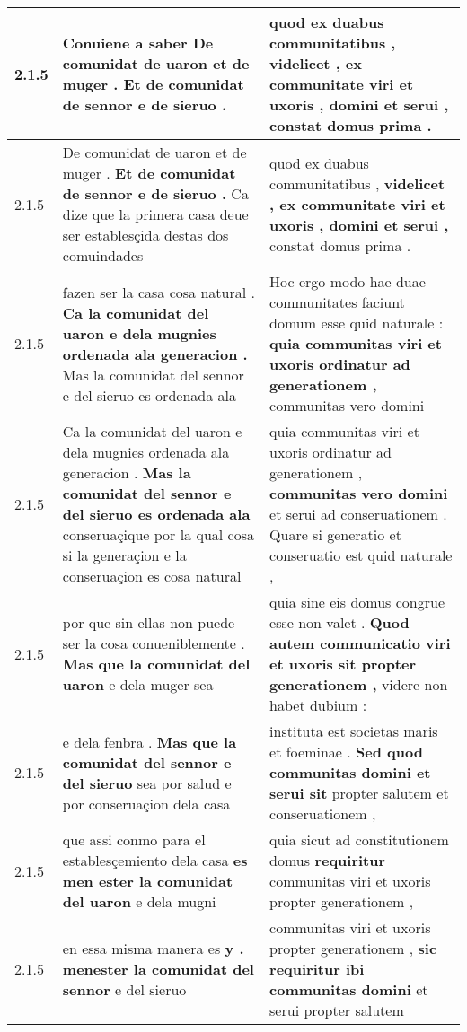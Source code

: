 \begin{tabular}{|p{1cm}|p{6.5cm}|p{6.5cm}|}
2.1.5 & Conuiene a saber \textbf{ De comunidat de uaron et de muger . } Et de comunidat de sennor e de sieruo . & quod ex duabus communitatibus , \textbf{ videlicet , ex communitate viri et uxoris , domini et serui , } constat domus prima . \\\hline
2.1.5 & De comunidat de uaron et de muger . \textbf{ Et de comunidat de sennor e de sieruo . } Ca dize que la primera casa deue ser establesçida destas dos comuindades & quod ex duabus communitatibus , \textbf{ videlicet , ex communitate viri et uxoris , domini et serui , } constat domus prima . \\\hline
2.1.5 & fazen ser la casa cosa natural . \textbf{ Ca la comunidat del uaron e dela mugnies ordenada ala generacion . } Mas la comunidat del sennor e del sieruo es ordenada ala & Hoc ergo modo hae duae communitates faciunt domum esse quid naturale : \textbf{ quia communitas viri et uxoris ordinatur ad generationem , } communitas vero domini \\\hline
2.1.5 & Ca la comunidat del uaron e dela mugnies ordenada ala generacion . \textbf{ Mas la comunidat del sennor e del sieruo es ordenada ala } conseruaçique por la qual cosa si la generaçion e la conseruaçion es cosa natural & quia communitas viri et uxoris ordinatur ad generationem , \textbf{ communitas vero domini } et serui ad conseruationem . Quare si generatio et conseruatio est quid naturale , \\\hline
2.1.5 & por que sin ellas non puede ser la cosa conueniblemente . \textbf{ Mas que la comunidat del uaron } e dela muger sea & quia sine eis domus congrue esse non valet . \textbf{ Quod autem communicatio viri et uxoris sit propter generationem , } videre non habet dubium : \\\hline
2.1.5 & e dela fenbra . \textbf{ Mas que la comunidat del sennor e del sieruo } sea por salud e por conseruaçion dela casa & instituta est societas maris et foeminae . \textbf{ Sed quod communitas domini et serui sit } propter salutem et conseruationem , \\\hline
2.1.5 & que assi conmo para el establesçemiento dela casa \textbf{ es men ester la comunidat del uaron } e dela mugni & quia sicut ad constitutionem domus \textbf{ requiritur } communitas viri et uxoris propter generationem , \\\hline
2.1.5 & en essa misma manera es \textbf{ y . menester la comunidat del sennor } e del sieruo & communitas viri et uxoris propter generationem , \textbf{ sic requiritur ibi communitas domini } et serui propter salutem \\\hline

\end{tabular}

